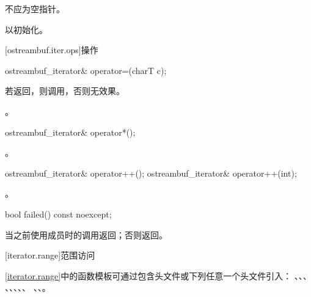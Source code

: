 \begin{itemdescr}
\pnum
\requires
{}不应为空指针。

\pnum
\effects
以初始化。
\end{itemdescr}

[ostreambuf.iter.ops]{操作}

%
\begin{itemdecl}
ostreambuf_iterator& operator=(charT c);
\end{itemdecl}

\begin{itemdescr}
\pnum
\effects
若返回，则调用，否则无效果。

\pnum
\returns
{}。
\end{itemdescr}

%
\begin{itemdecl}
ostreambuf_iterator& operator*();
\end{itemdecl}

\begin{itemdescr}
\pnum
\returns
{}。
\end{itemdescr}

%
\begin{itemdecl}
ostreambuf_iterator& operator++();
ostreambuf_iterator& operator++(int);
\end{itemdecl}

\begin{itemdescr}
\pnum
\returns
{}。
\end{itemdescr}

%
\begin{itemdecl}
bool failed() const noexcept;
\end{itemdecl}

\begin{itemdescr}
\pnum
\returns
{}当之前使用成员时的调用返回；否则返回。
\end{itemdescr}

[iterator.range]{范围访问}

\pnum
\ref{iterator.range}中的函数模板可通过包含头文件或下列任意一个头文件引入：
、、、
、、、、、
、、。

